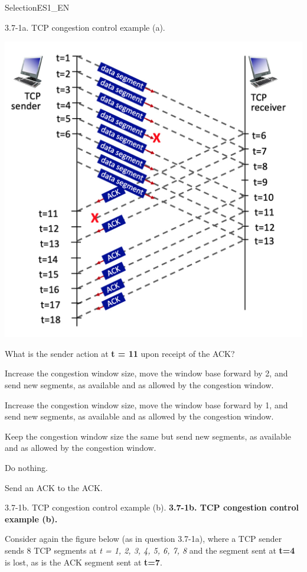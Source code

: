 \documentclass[a4paper]{article}
\begin{document}
\begin{quiz}{SelectionES1\_EN}
\begin{multi}[points=1,shuffle]{3.7-1a. TCP congestion control example (a).}
\begin{center}
\includegraphics[width=\linewidth]{figs/tcp_seq_ack_1.jpg}
\end{center}

What is the sender action at \textbf{t = 11} upon receipt of the ACK?
\item Increase the congestion window size, move the window base forward by 2, and send new segments, as available and as allowed by the congestion window.
\item* Increase the congestion window size, move the window base forward by 1, and send new segments, as available and as allowed by the congestion window.
\item Keep the congestion window size the same but send new segments, as available and as allowed by the congestion window.
\item Do nothing.
\item Send an ACK to the ACK.
\end{multi}

\begin{multi}[points=1,shuffle]{3.7-1b. TCP congestion control example (b).}
\textbf{3.7-1b. TCP congestion control example (b).}

Consider again the figure below (as in question 3.7-1a), where a TCP sender sends 8 TCP segments at \emph{t = 1, 2, 3, 4, 5, 6, 7, 8} and the segment sent at \textbf{t=4} is lost, as is the ACK segment sent at \textbf{t=7}. 


\end{multi}
\end{quiz}
\end{document}
